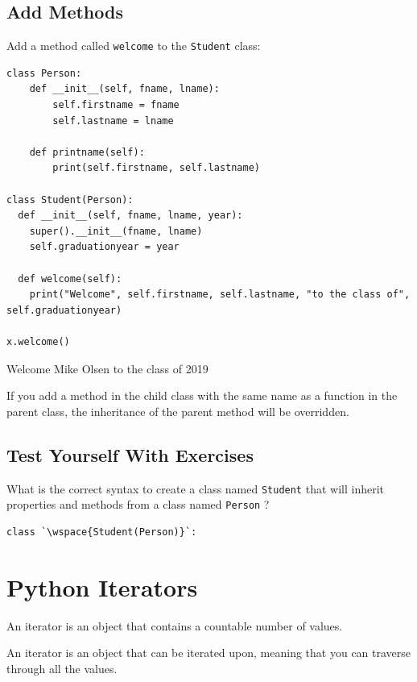 \documentclass[12pt,a4paper]{article}
\newcommand{\wspace}[1]{%
	\color{white}\colorbox{white}{\texttt{#1}}%
}
\newcommand{\lcode}[1]{%
	\lstinline{#1}%
}
\begin{document}
\subsection{Add Methods}

\begin{ebox}
	Add a method called \lcode{welcome} to the \lcode{Student} class:
	\begin{lstlisting}
class Person:
    def __init__(self, fname, lname):
        self.firstname = fname
        self.lastname = lname

    def printname(self):
        print(self.firstname, self.lastname)

class Student(Person):
  def __init__(self, fname, lname, year):
    super().__init__(fname, lname)
    self.graduationyear = year

  def welcome(self):
    print("Welcome", self.firstname, self.lastname, "to the class of", self.graduationyear)

x.welcome()
	\end{lstlisting}
\tcblower
	\begin{vercode}
Welcome Mike Olsen to the class of 2019
	\end{vercode}
\end{ebox}

If you add a method in the child class with the same name as a function in the
parent class, the inheritance of the parent method will be overridden.
\subsection{Test Yourself With Exercises}

\begin{tbox}
What is the correct syntax to create a class named \lcode{Student} that will inherit
properties and methods from a class named \lcode{Person}?
	\begin{lstlisting}
class `\wspace{Student(Person)}`:
	\end{lstlisting}
\end{tbox}
\vfill\newpage
\section{Python Iterators}

An iterator is an object that contains a countable number of values.

An iterator is an object that can be iterated upon, meaning that you can
traverse through all the values.
\end{document}
